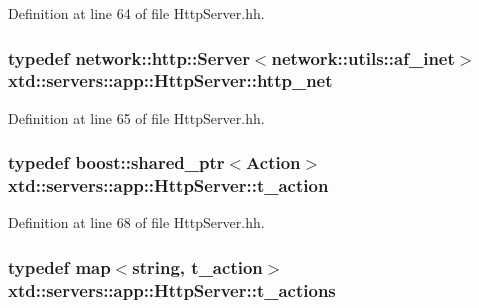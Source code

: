 Definition at line 64 of file Http\+Server.\+hh.

\subsubsection[{\texorpdfstring{http\+\_\+net}{http_net}}]{\setlength{\rightskip}{0pt plus 5cm}typedef network\+::http\+::\+Server$<$network\+::utils\+::af\+\_\+inet$>$ {\bf xtd\+::servers\+::app\+::\+Http\+Server\+::http\+\_\+net}\hspace{0.3cm}{\ttfamily [protected]}}\hypertarget{classxtd_1_1servers_1_1app_1_1HttpServer_ac5263de622bb17c3ec921a00266ea053}{}\label{classxtd_1_1servers_1_1app_1_1HttpServer_ac5263de622bb17c3ec921a00266ea053}


Definition at line 65 of file Http\+Server.\+hh.

\subsubsection[{\texorpdfstring{t\+\_\+action}{t_action}}]{\setlength{\rightskip}{0pt plus 5cm}typedef boost\+::shared\+\_\+ptr$<${\bf Action}$>$ {\bf xtd\+::servers\+::app\+::\+Http\+Server\+::t\+\_\+action}\hspace{0.3cm}{\ttfamily [protected]}}\hypertarget{classxtd_1_1servers_1_1app_1_1HttpServer_a1353c6e9098dd5f8a74d978a7049ad27}{}\label{classxtd_1_1servers_1_1app_1_1HttpServer_a1353c6e9098dd5f8a74d978a7049ad27}


Definition at line 68 of file Http\+Server.\+hh.

\subsubsection[{\texorpdfstring{t\+\_\+actions}{t_actions}}]{\setlength{\rightskip}{0pt plus 5cm}typedef map$<$string, {\bf t\+\_\+action}$>$ {\bf xtd\+::servers\+::app\+::\+Http\+Server\+::t\+\_\+actions}\hspace{0.3cm}{\ttfamily [protected]}}\hypertarget{classxtd_1_1servers_1_1app_1_1HttpServer_ac61c9a29bf64b94cb8ca4c766f8309c3}{}\label{classxtd_1_1servers_1_1app_1_1HttpServer_ac61c9a29bf64b94cb8ca4c766f8309c3}


